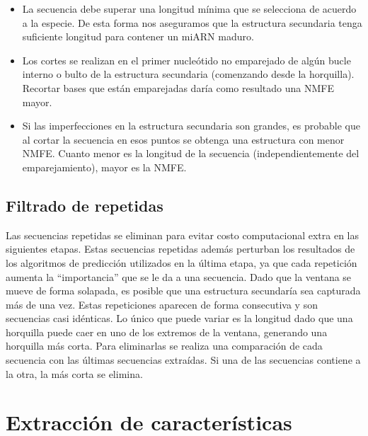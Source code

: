 \begin{itemize}
	\item La secuencia debe superar una longitud mínima que se selecciona de acuerdo a la especie. De esta forma nos aseguramos que la estructura
		secundaria tenga suficiente longitud para contener un miARN maduro.
	\item Los cortes se realizan en el primer nucleótido no emparejado de algún bucle interno o bulto de la estructura secundaria (comenzando desde la
		horquilla). Recortar bases que están emparejadas daría como resultado una NMFE mayor.
	\item Si las imperfecciones en la estructura secundaria son grandes, es probable que al cortar la secuencia en esos puntos se obtenga una estructura
		con menor NMFE. Cuanto menor es la longitud de la secuencia (independientemente del emparejamiento), mayor es la NMFE.
\end{itemize}

\subsection{Filtrado de repetidas}

Las secuencias repetidas se eliminan para evitar costo computacional extra en las siguientes etapas. Estas secuencias repetidas además perturban los
resultados de los algoritmos de predicción utilizados en la última etapa, ya que cada repetición aumenta la “importancia” que se le da a una secuencia.
 Dado que la ventana se mueve de forma solapada, es posible que una estructura secundaría sea capturada más de una vez. Estas repeticiones aparecen de forma
 consecutiva y son secuencias casi idénticas. Lo único que puede variar es la longitud dado que una horquilla puede caer en uno de los extremos de la ventana,
 generando una horquilla más corta. Para eliminarlas se realiza una comparación de cada secuencia con las últimas secuencias extraídas. Si una de las secuencias
 contiene a la otra, la más corta se elimina.

\section{Extracción de características}

